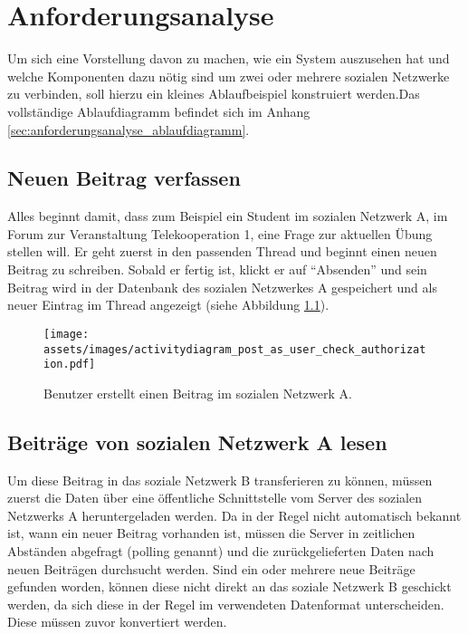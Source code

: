 
\chapter{Anforderungsanalyse} %
\label{cha:anforderungsanalyse}


Um sich eine Vorstellung davon zu machen, wie ein System auszusehen hat und welche Komponenten dazu nötig sind um zwei oder mehrere sozialen Netzwerke zu verbinden, soll hierzu ein kleines Ablaufbeispiel konstruiert werden.Das vollständige Ablaufdiagramm befindet sich im Anhang \ref{sec:anforderungsanalyse_ablaufdiagramm}. 

\section{Neuen Beitrag verfassen} %
\label{sec:neuen_beitrag_verfassen}


Alles beginnt damit, dass zum Beispiel ein Student im sozialen Netzwerk A, im Forum zur Veranstaltung Telekooperation 1, eine Frage zur aktuellen Übung stellen will. Er geht zuerst in den passenden Thread und beginnt einen neuen Beitrag zu schreiben. Sobald er fertig ist, klickt er auf \enquote{Absenden} und sein Beitrag wird in der Datenbank des sozialen Netzwerkes A gespeichert und als neuer Eintrag im Thread angezeigt (siehe Abbildung \ref{fig:beutzer_erstellt_beitrag_a}).

\medskip

\begin{figure}[ht]
     \texttt{[image: assets/images/activitydiagram\_post\_as\_user\_check\_authorization.pdf]}
    \caption{Benutzer erstellt einen Beitrag im sozialen Netzwerk A.}
    \label{fig:beutzer_erstellt_beitrag_a}
\end{figure}

\section{Beiträge von sozialen Netzwerk A lesen} %
\label{sec:beiträge_von_solzialen_netzwerk_a_lesen}


Um diese Beitrag in das soziale Netzwerk B transferieren zu können, müssen zuerst die Daten über eine öffentliche Schnittstelle vom Server des sozialen Netzwerks A heruntergeladen werden. Da in der Regel nicht automatisch bekannt ist, wann ein neuer Beitrag vorhanden ist, müssen die Server in zeitlichen Abständen abgefragt (polling genannt) und die zurückgelieferten Daten nach neuen Beiträgen durchsucht werden. Sind ein oder mehrere neue Beiträge gefunden worden, können diese nicht direkt an das soziale Netzwerk B geschickt werden, da sich diese in der Regel im verwendeten Datenformat unterscheiden. Diese müssen zuvor konvertiert werden.

